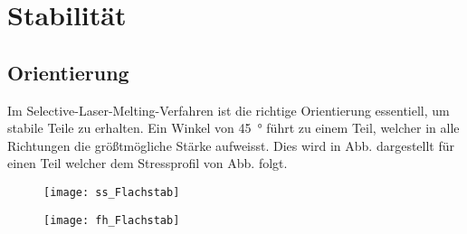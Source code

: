 \documentclass[../main.tex]{subfiles}
\begin{document}
\section{Stabilität}
\subsection{Orientierung}
Im Selective-Laser-Melting-Verfahren ist die richtige Orientierung essentiell, um stabile Teile zu erhalten.
Ein Winkel von \qty{45}{\degree} führt zu einem Teil, welcher in alle Richtungen die größtmögliche Stärke aufweisst. Dies wird in Abb. dargestellt für einen Teil welcher dem Stressprofil von Abb. folgt.
\begin{figure}[h]
	\centering
	\texttt{[image: ss\_Flachstab]}
	\label{img:ss_1}
\end{figure}
\begin{figure}[h]
	\centering
	\texttt{[image: fh\_Flachstab]}
	\label{img:fh_1}
\end{figure}
\end{document}
